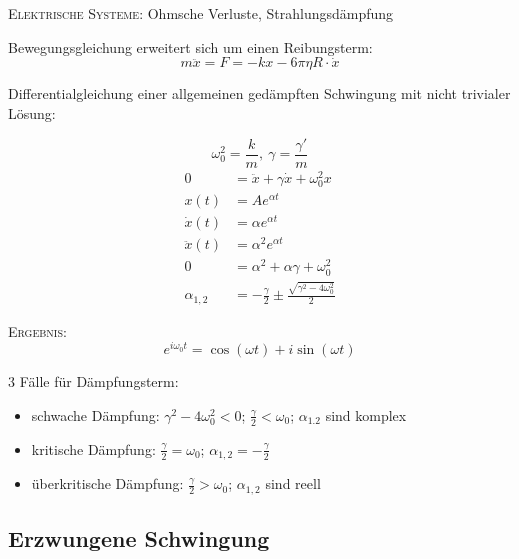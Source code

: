 \documentclass[a4paper,12pt]{report}
\begin{document}
\textsc{Elektrische Systeme:} Ohmsche Verluste, Strahlungsdämpfung

Bewegungsgleichung erweitert sich um einen Reibungsterm: \\

\begin{equation}
m \ddot{x} = F = - kx - 6 \pi \eta R \cdot \dot{x} 
\end{equation}

Differentialgleichung einer allgemeinen gedämpften Schwingung mit nicht trivialer Lösung:

 \begin{equation*}
\omega_0^2 = \frac{k}{m}, \:  \gamma = \frac{\gamma '}{m}
\end{equation*}
\begin{align*}
0 &= \ddot{x} + \gamma \dot{x} + \omega_0^2x \\
x(t) &= A e^{\alpha t}  \\
\dot{x}(t) &= \alpha e^{\alpha t} \\
\ddot{x}(t) &= \alpha^2 e^{\alpha t} \\
0 &= \alpha^2 + \alpha \gamma +  \omega_0^2 \\
\alpha_{1,2} &= - \frac{\gamma}{2} \pm \frac{\sqrt{\gamma^2 - 4  \omega_0^2}}{2} 
\end{align*}

\textsc{Ergebnis: }
\begin{equation}
e^{i \omega_0t}= \cos(\omega t) + i \sin(\omega t) 
\end{equation}

3 Fälle für Dämpfungsterm:

\begin{itemize}
\item schwache Dämpfung: $\gamma^2 - 4 \omega_0^2 < 0$;  \quad   $\frac{\gamma}{2} <  \omega_0$;  \quad   $\alpha_{1.2} $  sind komplex\\
\item kritische Dämpfung: $ \frac{\gamma}{2} = \omega_0 $; \quad $\alpha_{1,2} = -\frac{\gamma}{2} $ \\
\item überkritische Dämpfung: $\frac{\gamma}{2} > \omega_0 $; \quad $ \alpha_{1,2} $ sind reell 
\end{itemize}

\subsection{Erzwungene Schwingung}
\end{document}

